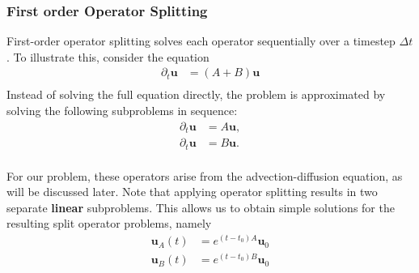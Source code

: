 \subsubsection{First order Operator Splitting}
First-order operator splitting solves each operator sequentially over a 
timestep $\Delta t$. To illustrate this, consider the equation 
\begin{align}
    \partial_t  \bm{u} &= (A+B)\bm{u} \\
\end{align}
Instead of solving the full equation directly, the problem is approximated
by solving the following subproblems in sequence:
\begin{align}
    \partial_t \bm{u} &= A\bm{u}, \\
    \partial_t \bm{u} &= B\bm{u}. \\
\end{align}

For our problem, these operators arise from the advection-diffusion 
equation, as will be discussed later. Note that applying operator 
splitting results in two separate \textbf{linear} subproblems. This allows
us to obtain simple solutions for the resulting split operator problems,
namely
\begin{align}
    \bm u_A(t) &= e^{(t-t_0) A}\bm u_0 \\
    \bm u_B(t) &= e^{(t-t_0) B}\bm u_0 
\end{align}

